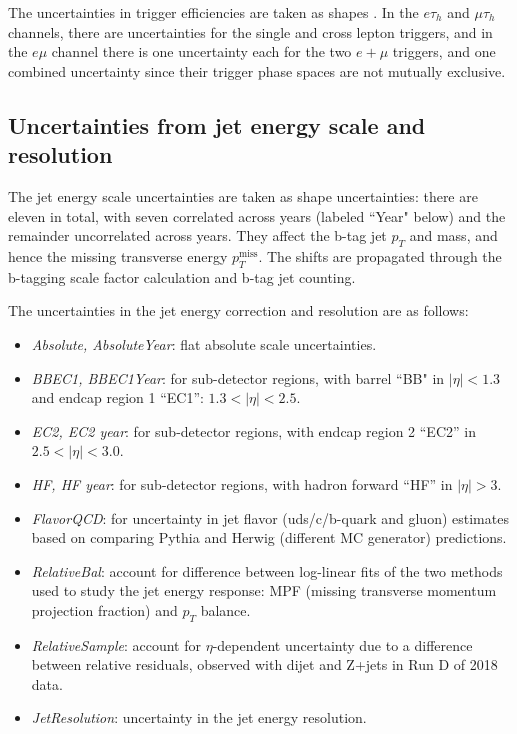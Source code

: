 The uncertainties in trigger efficiencies are taken as shapes \cite{twiki_TAU_POG_tauidrecommendationforrun2}. In the $e\tau_{h}$ and $\mu\tau_{h}$ channels, there are uncertainties for the single and cross lepton triggers, and in the $e\mu$ channel there is one uncertainty each for the two $e+\mu$ triggers, and one combined uncertainty since their trigger phase spaces are not mutually exclusive.

\subsection{Uncertainties from jet energy scale and resolution}
\label{subsec:JEC_sys}
The jet energy scale uncertainties are taken as shape uncertainties: there are eleven in total, with seven correlated across years (labeled ``Year" below) and the remainder uncorrelated across years. They affect the b-tag jet $p_{T}$ and mass, and hence the missing transverse energy $p_{T}^{\text{miss}}$. The shifts are propagated through the b-tagging scale factor calculation and b-tag jet counting. 

The uncertainties in the jet energy correction and resolution \cite{CMS-JME-13-004} \cite{twiki_JetEnergyScale_Uncertainty_Sources_JERC} are as follows:
    \begin{itemize}
        \item \textit{Absolute, AbsoluteYear}: flat absolute scale uncertainties.
        \item \textit{BBEC1, BBEC1Year}: for sub-detector regions, with barrel ``BB" in $|\eta| < 1.3$ and endcap region 1 ``EC1'': $1.3 < |\eta| < 2.5$.
        \item \textit{EC2, EC2 year}: for sub-detector regions, with endcap region 2 ``EC2'' in $2.5 < |\eta| < 3.0$.
        \item \textit{HF, HF year}: for sub-detector regions, with hadron forward ``HF'' in $|\eta| > 3$.
        \item \textit{FlavorQCD}: for uncertainty in jet flavor (uds/c/b-quark and gluon) estimates based on comparing Pythia and Herwig (different MC generator) predictions. 
        \item \textit{RelativeBal}: account for difference between log-linear fits of the two methods used to study the jet energy response: MPF (missing transverse momentum projection fraction) and $p_{T}$ balance.
        \item \textit{RelativeSample}: account for $\eta$-dependent uncertainty due to a difference between relative residuals, observed with dijet and Z+jets in Run D of 2018 data.
        \item \textit{JetResolution}: uncertainty in the jet energy resolution.
    \end{itemize}

